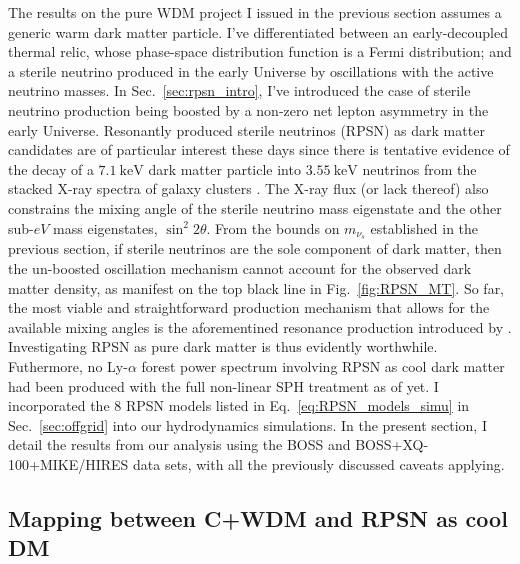 The results on the pure WDM project I issued in the previous section assumes a generic warm dark matter particle. I've differentiated between an early-decoupled thermal relic, whose phase-space distribution function is a Fermi distribution; and a sterile neutrino produced in the early Universe by oscillations with the active neutrino masses. In Sec.~\ref{sec:rpsn_intro}, I've introduced the case of sterile neutrino production being boosted by a non-zero net lepton asymmetry in the early Universe. Resonantly produced sterile neutrinos (RPSN) as dark matter candidates are of particular interest these days since there is tentative evidence of the decay of a $7.1 ~\mathrm{keV}$ dark matter particle into $3.55~\mathrm{keV}$ neutrinos from the stacked X-ray spectra of galaxy clusters \citep{Bulbul14, Boyarsky14}. The X-ray flux (or lack thereof) also constrains the mixing angle of the sterile neutrino mass eigenstate and the other sub-$eV$ mass eigenstates, $\sin^2 2 \theta$. From the bounds on $m_{\nu_s}$ established in the previous section, if sterile neutrinos are the sole component of dark matter, then the un-boosted oscillation mechanism cannot account for the observed dark matter density, as manifest on the top black line in Fig.~\ref{fig:RPSN_MT}. So far, the most viable and straightforward production mechanism that allows for the available mixing angles is the aforementined resonance production introduced by \cite{ShiFuller99}. Investigating RPSN as pure dark matter is thus evidently worthwhile. Futhermore, no Ly-$\alpha$ forest power spectrum involving RPSN as cool dark matter had been produced with the full non-linear SPH treatment as of yet. I incorporated the 8 RPSN models listed in Eq.~\ref{eq:RPSN_models_simu} in Sec.~\ref{sec:offgrid} into our hydrodynamics simulations. In the present section, I detail the results from our analysis using the BOSS and BOSS+XQ-100+MIKE/HIRES data sets, with all the previously discussed caveats applying.\\

\subsection{Mapping between C+WDM and RPSN as cool DM}
\label{sec:mapping_flux_RPSN_CWDM}

